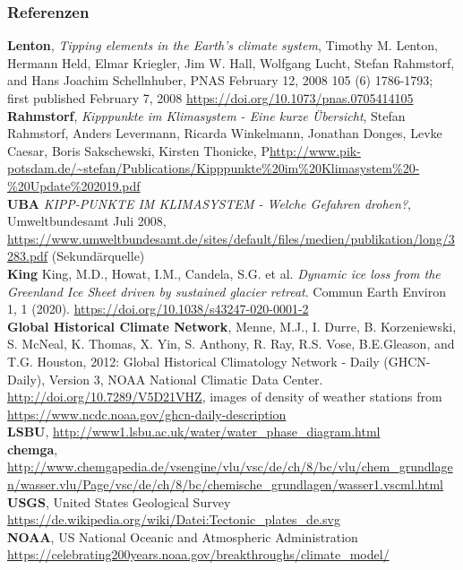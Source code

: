 \begin{frame}
	\frametitle{Referenzen}
	\small{
	\textbf{Lenton}, \textit{Tipping elements in the Earth's climate system},
	Timothy M. Lenton, Hermann Held, Elmar Kriegler, Jim W. Hall, Wolfgang Lucht, Stefan Rahmstorf, and Hans Joachim Schellnhuber,
	PNAS February 12, 2008 105 (6) 1786-1793; first published February 7, 2008 \url{https://doi.org/10.1073/pnas.0705414105}\\
	\textbf{Rahmstorf}, \textit{Kipppunkte im Klimasystem - Eine kurze Übersicht},
	Stefan Rahmstorf, Anders Levermann, Ricarda Winkelmann, Jonathan Donges, Levke Caesar, Boris Sakschewski, Kirsten Thonicke,
	P\url{http://www.pik-potsdam.de/~stefan/Publications/Kipppunkte\%20im\%20Klimasystem\%20-\%20Update\%202019.pdf} \\
	\textbf{UBA} \textit{KIPP-PUNKTE IM KLIMASYSTEM - Welche Gefahren drohen?}, Umweltbundesamt Juli 2008, \url{https://www.umweltbundesamt.de/sites/default/files/medien/publikation/long/3283.pdf} (Sekundärquelle)\\
	\textbf{King} King, M.D., Howat, I.M., Candela, S.G. et al. \textit{Dynamic ice loss from the Greenland Ice Sheet driven by sustained glacier retreat}. Commun Earth Environ 1, 1 (2020). \url{https://doi.org/10.1038/s43247-020-0001-2}\\
	\textbf{Global Historical Climate Network}, Menne, M.J., I. Durre, B. Korzeniewski, S. McNeal, K. Thomas, X. Yin, S. Anthony, R. Ray, R.S. Vose, B.E.Gleason, and T.G. Houston, 2012: Global Historical Climatology Network - Daily (GHCN-Daily), Version 3, NOAA National Climatic Data Center. \url{http://doi.org/10.7289/V5D21VHZ}, images of density of weather stations from \url{https://www.ncdc.noaa.gov/ghcn-daily-description}\\
	\textbf{LSBU}, \url{http://www1.lsbu.ac.uk/water/water_phase_diagram.html}\\
	\textbf{chemga}, \url{http://www.chemgapedia.de/vsengine/vlu/vsc/de/ch/8/bc/vlu/chem_grundlagen/wasser.vlu/Page/vsc/de/ch/8/bc/chemische_grundlagen/wasser1.vscml.html}\\
	\textbf{USGS}, United States Geological Survey \url{https://de.wikipedia.org/wiki/Datei:Tectonic_plates_de.svg}\\
	\textbf{NOAA}, US National Oceanic and Atmospheric Administration \url{https://celebrating200years.noaa.gov/breakthroughs/climate_model/}\\
	}
\end{frame}
